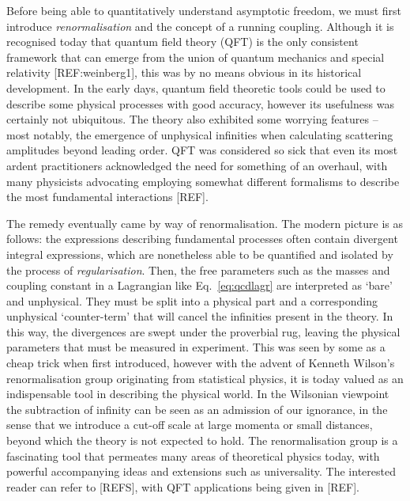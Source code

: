 \documentclass[12pt, a4paper, twoside]{book}
\begin{document}
Before being able to quantitatively understand asymptotic freedom, we must first introduce \emph{renormalisation} and the concept of a running coupling. Although it is recognised today that quantum field theory (QFT) is the only consistent framework that can emerge from the union of quantum mechanics and special relativity [REF:weinberg1], this was by no means obvious in its historical development. In the early days, quantum field theoretic tools could be used to describe some physical processes with good accuracy, however its usefulness was certainly not ubiquitous. The theory also exhibited some worrying features -- most notably, the emergence of unphysical infinities when calculating scattering amplitudes beyond leading order. QFT was considered so sick that even its most ardent practitioners acknowledged the need for something of an overhaul, with many physicists advocating employing somewhat different formalisms to describe the most fundamental interactions [REF].

The remedy eventually came by way of renormalisation. The modern picture is as follows: the expressions describing fundamental processes often contain divergent integral expressions, which are nonetheless able to be quantified and isolated by the process of \emph{regularisation}. Then, the free parameters such as the masses and coupling constant in a Lagrangian like Eq.~\eqref{eq:qcdlagr} are interpreted as `bare' and unphysical. They must be split into a physical part and a corresponding unphysical `counter-term' that will cancel the infinities present in the theory. In this way, the divergences are swept under the proverbial rug, leaving the physical parameters that must be measured in experiment. This was seen by some as a cheap trick when first introduced, however with the advent of Kenneth Wilson's renormalisation group originating from statistical physics, it is today valued as an indispensable tool in describing the physical world. In the Wilsonian viewpoint the subtraction of infinity can be seen as an admission of our ignorance, in the sense that we introduce a cut-off scale at large momenta or small distances, beyond which the theory is not expected to hold. The renormalisation group is a fascinating tool that permeates many areas of theoretical physics today, with powerful accompanying ideas and extensions such as universality. The interested reader can refer to [REFS], with QFT applications being given in [REF].
\end{document}
